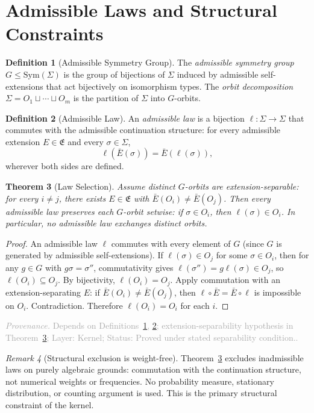 \documentclass[11pt,a4paper]{article}
\newtheorem{theorem}{Theorem}[section]
\theoremstyle{definition}
\newtheorem{definition}[theorem]{Definition}
\theoremstyle{remark}
\newtheorem{remark}[theorem]{Remark}
\newcommand{\assumptionfooter}[3]{%
  \par\smallskip\noindent\textcolor{darkgray}{\footnotesize\textit{Provenance.} Depends on #1; Layer: #2; Status: #3.}\par\medskip
}
\begin{document}
\section{Admissible Laws and Structural Constraints}

\begin{definition}[Admissible Symmetry Group]\label{def:admiss-sym}
The \emph{admissible symmetry group} $G \leq \mathrm{Sym}(\Sigma)$ is the group of bijections of $\Sigma$ induced by admissible self-extensions that act bijectively on isomorphism types. The \emph{orbit decomposition} $\Sigma = O_1 \sqcup \cdots \sqcup O_m$ is the partition of $\Sigma$ into $G$-orbits.
\end{definition}

\begin{definition}[Admissible Law]\label{def:law}
An \emph{admissible law} is a bijection $\ell \colon \Sigma \to \Sigma$ that commutes with the admissible continuation structure: for every admissible extension $E \in \mathfrak{E}$ and every $\sigma \in \Sigma$,
\[
  \ell(\bar{E}(\sigma)) = \bar{E}(\ell(\sigma)),
\]
wherever both sides are defined.
\end{definition}

\begin{theorem}[Law Selection]\label{thm:law}
Assume distinct $G$-orbits are extension-separable: for every $i \neq j$, there exists $E \in \mathfrak{E}$ with $\bar{E}(O_i) \neq \bar{E}(O_j)$. Then every admissible law preserves each $G$-orbit setwise: if $\sigma \in O_i$, then $\ell(\sigma) \in O_i$. In particular, no admissible law exchanges distinct orbits.
\end{theorem}
\begin{proof}
An admissible law $\ell$ commutes with every element of $G$ (since $G$ is generated by admissible self-extensions). If $\ell(\sigma) \in O_j$ for some $\sigma \in O_i$, then for any $g \in G$ with $g\sigma = \sigma''$, commutativity gives $\ell(\sigma'') = g\ell(\sigma) \in O_j$, so $\ell(O_i) \subseteq O_j$. By bijectivity, $\ell(O_i)=O_j$. Apply commutation with an extension-separating $E$: if $\bar{E}(O_i) \neq \bar{E}(O_j)$, then $\ell \circ \bar{E} = \bar{E} \circ \ell$ is impossible on $O_i$. Contradiction. Therefore $\ell(O_i)=O_i$ for each $i$.
\end{proof}
\assumptionfooter{Definitions~\ref{def:admiss-sym}, \ref{def:law}; extension-separability hypothesis in Theorem~\ref{thm:law}}{Kernel}{Proved under stated separability condition.}

\begin{remark}[Structural exclusion is weight-free]\label{rem:weight-free}
Theorem~\ref{thm:law} excludes inadmissible laws on purely algebraic grounds: commutation with the continuation structure, not numerical weights or frequencies. No probability measure, stationary distribution, or counting argument is used. This is the primary structural constraint of the kernel.
\end{remark}
\end{document}
